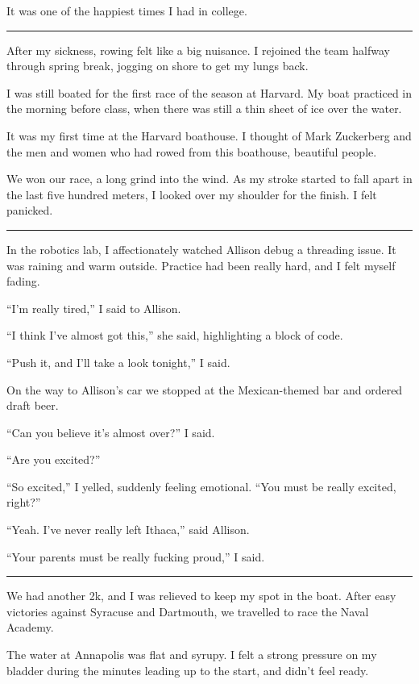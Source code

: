 It was one of the happiest times I had in college.

\plainfancybreak{12pt}{2}{}

After my sickness, rowing felt like a big nuisance.  I rejoined the team halfway
through spring break, jogging on shore to get my lungs back.

I was still boated for the first race of the season at Harvard.  My boat
practiced in the morning before class, when there was still a thin sheet of ice
over the water.

It was my first time at the Harvard boathouse.  I thought of Mark Zuckerberg and
the men and women who had rowed from this boathouse, beautiful people.

We won our race, a long grind into the wind.  As my stroke started to fall apart
in the last five hundred meters, I looked over my shoulder for the finish.  I felt
panicked.

\plainfancybreak{12pt}{2}{}

In the robotics lab, I affectionately watched Allison debug a threading issue.
It was raining and warm outside.  Practice had been really hard, and I felt
myself fading.

``I'm really tired,'' I said to Allison.

``I think I've almost got this,'' she said, highlighting a block of code.

``Push it, and I'll take a look tonight,'' I said.

On the way to Allison's car we stopped at the Mexican-themed bar and ordered
draft beer.

``Can you believe it's almost over?'' I said.

``Are you excited?''

``So excited,'' I yelled, suddenly feeling emotional.  ``You must be
really excited, right?''

``Yeah.  I've never really left Ithaca,'' said Allison.

``Your parents must be really fucking proud,'' I said.

\plainfancybreak{12pt}{2}{}

We had another 2k, and I was relieved to keep my spot in the boat.  After easy
victories against Syracuse and Dartmouth, we travelled to race the Naval
Academy.

The water at Annapolis was flat and syrupy.  I felt a strong pressure on my
bladder during the minutes leading up to the start, and didn't feel ready.

